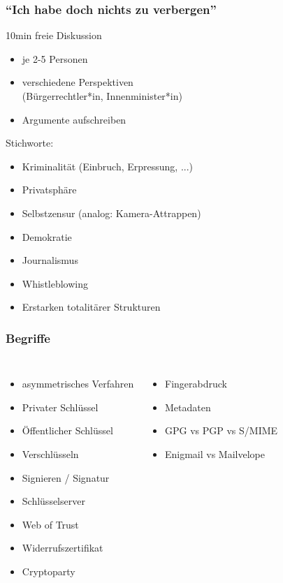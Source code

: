 \documentclass{beamer}
\begin{document}

\begin{frame}[label=d1]
  \frametitle{"`Ich habe doch nichts zu verbergen"'}
  10min freie Diskussion
  
  \begin{itemize}
   \item  je 2-5 Personen
   \item verschiedene Perspektiven\\
  (Bürgerrechtler*in, Innenminister*in)
   \item Argumente aufschreiben
  \end{itemize}
  \pause
  Stichworte:
  \begin{itemize}
   \item Kriminalität (Einbruch, Erpressung, ...)
   \item Privatsphäre
   \item Selbstzensur (analog: Kamera-Attrappen)
   \item Demokratie
   \item Journalismus
   \item Whistleblowing
   \item Erstarken totalitärer Strukturen
   
  \end{itemize}

  
\end{frame}





\begin{frame}[label=begriffe]
  \frametitle{Begriffe}
  
  \begin{columns}

  \begin{itemize}
   \item asymmetrisches Verfahren
   \item Privater Schlüssel
   \item Öffentlicher Schlüssel
   \item Verschlüsseln
   \item Signieren / Signatur
   \item Schlüsselserver
   \item Web of Trust
   \item Widerrufszertifikat
   \item Cryptoparty
  \end{itemize}
  \begin{itemize}
   \item Fingerabdruck
   \item Metadaten
   \item GPG vs PGP {\tiny vs S/MIME}
   \item Enigmail vs Mailvelope
  \end{itemize}
\end{columns}
\end{frame}
\end{document}
